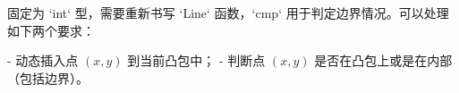 固定为 `int` 型，需要重新书写 `Line` 函数，`cmp` 用于判定边界情况。可以处理如下两个要求：

- 动态插入点 $(x,y)$ 到当前凸包中；
- 判断点 $(x,y)$ 是否在凸包上或是在内部（包括边界）。